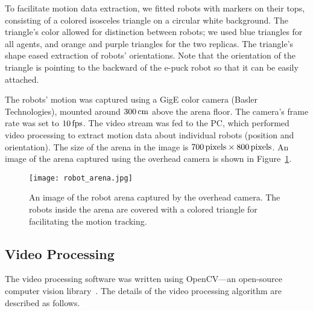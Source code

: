 To facilitate motion data extraction, we fitted robots with markers on their tops, consisting of a colored isosceles triangle on a circular white background. The triangle's color allowed for distinction between robots; we used blue triangles for all agents, and orange and purple triangles for the two replicas. The triangle's shape eased extraction of robots' orientations. Note that the orientation of the triangle is pointing to the backward of the e-puck robot so that it can be easily attached.

The robots' motion was captured using a GigE color camera (Basler Technologies), mounted around $\unit[300]{cm}$ above the arena floor. The camera's frame rate was set to $\unit[10]{fps}$. The video stream was fed to the PC, which performed video processing to extract motion data about individual robots (position and orientation). The size of the arena in the image is $\unit[700]{pixels} \times \unit[800]{pixels}$. An image of the arena captured using the overhead camera is shown in Figure~\ref{fig:robot_arena}.
%
\begin{figure}[!t]
    \centering
    \texttt{[image: robot\_arena.jpg]}
    \caption{An image of the robot arena captured by the overhead camera. The robots inside the arena are covered with a colored triangle for facilitating the motion tracking.}
    \label{fig:robot_arena}
\end{figure} 
%
\subsection{Video Processing}\label{sec:video_processing_physical_swarm}

The video processing software was written using OpenCV---an open-source computer vision library~\cite{Gary2008}. The details of the video processing algorithm are described as follows. 


